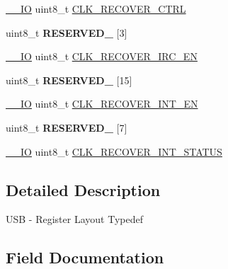 \begin{DoxyCompactItemize}
\mbox{\hyperlink{core__cm0plus_8h_aec43007d9998a0a0e01faede4133d6be}{\+\_\+\+\_\+\+IO}} uint8\+\_\+t \mbox{\hyperlink{struct_u_s_b___type_aa40fc6462cf87d4569e0039075b5890b}{C\+L\+K\+\_\+\+R\+E\+C\+O\+V\+E\+R\+\_\+\+C\+T\+RL}}
\item 
\mbox{\label{struct_u_s_b___type_afce8b8ee222ad221564a0c6c9c99bbb7}} 
uint8\+\_\+t {\bfseries R\+E\+S\+E\+R\+V\+E\+D\+\_} \mbox{[}3\mbox{]}
\item 
\mbox{\hyperlink{core__cm0plus_8h_aec43007d9998a0a0e01faede4133d6be}{\+\_\+\+\_\+\+IO}} uint8\+\_\+t \mbox{\hyperlink{struct_u_s_b___type_a9cd5cd20ce5d7dbf868a7af12fe69b81}{C\+L\+K\+\_\+\+R\+E\+C\+O\+V\+E\+R\+\_\+\+I\+R\+C\+\_\+\+EN}}
\item 
\mbox{\label{struct_u_s_b___type_ab3d7942a7a9b348385666aa94a3d02be}} 
uint8\+\_\+t {\bfseries R\+E\+S\+E\+R\+V\+E\+D\+\_} \mbox{[}15\mbox{]}
\item 
\mbox{\hyperlink{core__cm0plus_8h_aec43007d9998a0a0e01faede4133d6be}{\+\_\+\+\_\+\+IO}} uint8\+\_\+t \mbox{\hyperlink{struct_u_s_b___type_aa3c8a58fb8efc1e8e238232aa765a801}{C\+L\+K\+\_\+\+R\+E\+C\+O\+V\+E\+R\+\_\+\+I\+N\+T\+\_\+\+EN}}
\item 
\mbox{\label{struct_u_s_b___type_a2837640f65ef8f8f0557c3873851f951}} 
uint8\+\_\+t {\bfseries R\+E\+S\+E\+R\+V\+E\+D\+\_} \mbox{[}7\mbox{]}
\item 
\mbox{\hyperlink{core__cm0plus_8h_aec43007d9998a0a0e01faede4133d6be}{\+\_\+\+\_\+\+IO}} uint8\+\_\+t \mbox{\hyperlink{struct_u_s_b___type_a45cfec446adcac8826db39db8dfb292d}{C\+L\+K\+\_\+\+R\+E\+C\+O\+V\+E\+R\+\_\+\+I\+N\+T\+\_\+\+S\+T\+A\+T\+US}}
\end{DoxyCompactItemize}


\subsection{Detailed Description}
U\+SB -\/ Register Layout Typedef 

\subsection{Field Documentation}
\mbox{\label{struct_u_s_b___type_a3b414f3639d8e9ccdeccf5ec15029b9c}} 
